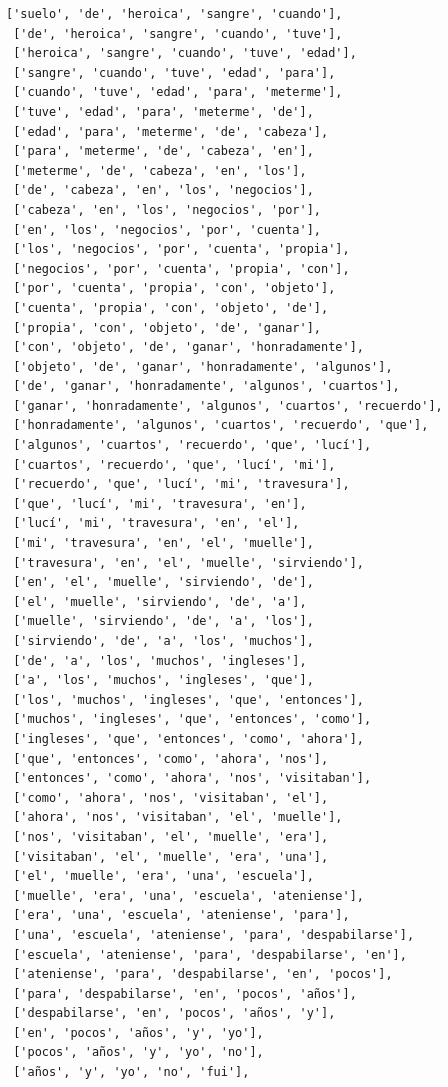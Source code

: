 \documentclass[11pt]{article}
\begin{document}
\begin{tcolorbox}[breakable, size=fbox, boxrule=1pt, pad at break*=1mm,colback=cellbackground, colframe=cellborder]
\begin{Verbatim}[commandchars=\\\{\}]
 ['suelo', 'de', 'heroica', 'sangre', 'cuando'],
 ['de', 'heroica', 'sangre', 'cuando', 'tuve'],
 ['heroica', 'sangre', 'cuando', 'tuve', 'edad'],
 ['sangre', 'cuando', 'tuve', 'edad', 'para'],
 ['cuando', 'tuve', 'edad', 'para', 'meterme'],
 ['tuve', 'edad', 'para', 'meterme', 'de'],
 ['edad', 'para', 'meterme', 'de', 'cabeza'],
 ['para', 'meterme', 'de', 'cabeza', 'en'],
 ['meterme', 'de', 'cabeza', 'en', 'los'],
 ['de', 'cabeza', 'en', 'los', 'negocios'],
 ['cabeza', 'en', 'los', 'negocios', 'por'],
 ['en', 'los', 'negocios', 'por', 'cuenta'],
 ['los', 'negocios', 'por', 'cuenta', 'propia'],
 ['negocios', 'por', 'cuenta', 'propia', 'con'],
 ['por', 'cuenta', 'propia', 'con', 'objeto'],
 ['cuenta', 'propia', 'con', 'objeto', 'de'],
 ['propia', 'con', 'objeto', 'de', 'ganar'],
 ['con', 'objeto', 'de', 'ganar', 'honradamente'],
 ['objeto', 'de', 'ganar', 'honradamente', 'algunos'],
 ['de', 'ganar', 'honradamente', 'algunos', 'cuartos'],
 ['ganar', 'honradamente', 'algunos', 'cuartos', 'recuerdo'],
 ['honradamente', 'algunos', 'cuartos', 'recuerdo', 'que'],
 ['algunos', 'cuartos', 'recuerdo', 'que', 'lucí'],
 ['cuartos', 'recuerdo', 'que', 'lucí', 'mi'],
 ['recuerdo', 'que', 'lucí', 'mi', 'travesura'],
 ['que', 'lucí', 'mi', 'travesura', 'en'],
 ['lucí', 'mi', 'travesura', 'en', 'el'],
 ['mi', 'travesura', 'en', 'el', 'muelle'],
 ['travesura', 'en', 'el', 'muelle', 'sirviendo'],
 ['en', 'el', 'muelle', 'sirviendo', 'de'],
 ['el', 'muelle', 'sirviendo', 'de', 'a'],
 ['muelle', 'sirviendo', 'de', 'a', 'los'],
 ['sirviendo', 'de', 'a', 'los', 'muchos'],
 ['de', 'a', 'los', 'muchos', 'ingleses'],
 ['a', 'los', 'muchos', 'ingleses', 'que'],
 ['los', 'muchos', 'ingleses', 'que', 'entonces'],
 ['muchos', 'ingleses', 'que', 'entonces', 'como'],
 ['ingleses', 'que', 'entonces', 'como', 'ahora'],
 ['que', 'entonces', 'como', 'ahora', 'nos'],
 ['entonces', 'como', 'ahora', 'nos', 'visitaban'],
 ['como', 'ahora', 'nos', 'visitaban', 'el'],
 ['ahora', 'nos', 'visitaban', 'el', 'muelle'],
 ['nos', 'visitaban', 'el', 'muelle', 'era'],
 ['visitaban', 'el', 'muelle', 'era', 'una'],
 ['el', 'muelle', 'era', 'una', 'escuela'],
 ['muelle', 'era', 'una', 'escuela', 'ateniense'],
 ['era', 'una', 'escuela', 'ateniense', 'para'],
 ['una', 'escuela', 'ateniense', 'para', 'despabilarse'],
 ['escuela', 'ateniense', 'para', 'despabilarse', 'en'],
 ['ateniense', 'para', 'despabilarse', 'en', 'pocos'],
 ['para', 'despabilarse', 'en', 'pocos', 'años'],
 ['despabilarse', 'en', 'pocos', 'años', 'y'],
 ['en', 'pocos', 'años', 'y', 'yo'],
 ['pocos', 'años', 'y', 'yo', 'no'],
 ['años', 'y', 'yo', 'no', 'fui'],

\end{Verbatim}
\end{tcolorbox}
\end{document}
